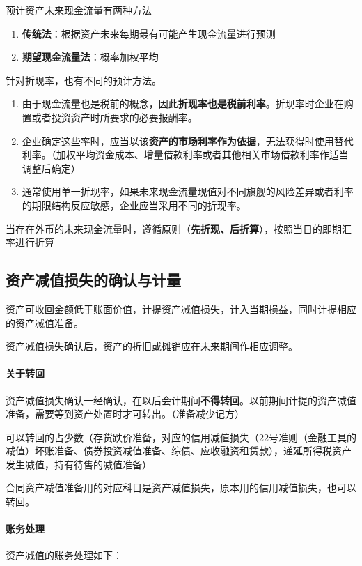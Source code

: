 \documentclass[UTF8,12pt]{ctexart}
\numberwithin{equation}{section} %
\numberwithin{figure}{section}
\numberwithin{table}{section}
\begin{document}
	预计资产未来现金流量有两种方法
	\begin{enumerate}
		\item \textbf{传统法}：根据资产未来每期最有可能产生现金流量进行预测
		
		\item \textbf{期望现金流量法}：概率加权平均
	\end{enumerate}
	
	针对折现率，也有不同的预计方法。 
	\begin{enumerate}
		\item 由于现金流量也是税前的概念，因此\textbf{折现率也是税前利率}。折现率时企业在购置或者投资资产时所要求的必要报酬率。
		
		\item 企业确定这些率时，应当以该\textbf{资产的市场利率作为依据}，无法获得时使用替代利率。（加权平均资金成本、增量借款利率或者其他相关市场借款利率作适当调整后确定）
		
		\item 通常使用单一折现率，如果未来现金流量现值对不同旗舰的风险差异或者利率的期限结构反应敏感，企业应当采用不同的折现率。 
	\end{enumerate}
	
	当存在外币的未来现金流量时，遵循原则（\textbf{先折现、后折算}），按照当日的即期汇率进行折算
	
	\subsection{资产减值损失的确认与计量}
	资产可收回金额低于账面价值，计提资产减值损失，计入当期损益，同时计提相应的资产减值准备。
	
	资产减值损失确认后，资产的折旧或摊销应在未来期间作相应调整。
	
	\paragraph{关于转回}
	资产减值损失确认一经确认，在以后会计期间\textbf{不得转回}。以前期间计提的资产减值准备，需要等到资产处置时才可转出。（准备减少记方）
	
	可以转回的占少数（存货跌价准备，对应的信用减值损失（22号准则（金融工具的减值）坏账准备、债券投资减值准备、综债、应收融资租赁款），递延所得税资产发生减值，持有待售的减值准备）
	
	合同资产减值准备用的对应科目是资产减值损失，原本用的信用减值损失，也可以转回。 
	
	\paragraph{账务处理}
	资产减值的账务处理如下：
	
\end{document}
